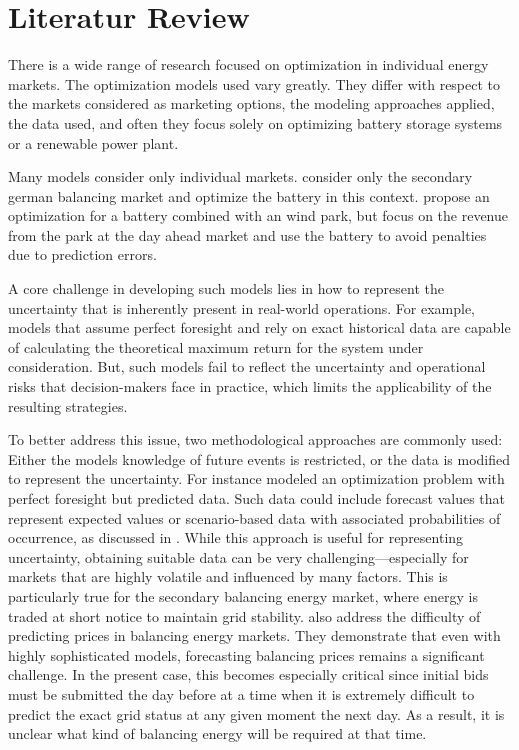 \chapter{Literatur Review}

There is a wide range of research focused on optimization in individual energy markets.
The optimization models used vary greatly.
They differ with respect to the markets considered as marketing options,
the modeling approaches applied, the data used, and often they focus solely on optimizing
battery storage systems or a renewable power plant.

Many models consider only individual markets. \cite{Olk.2019} consider only the secondary german balancing market and
optimize the battery in this context. \cite{Cai.2016} propose an optimization for a battery combined with an wind park, but
focus on the revenue from the park at the day ahead market and use the battery to avoid penalties due to prediction errors.

A core challenge in developing such models lies in how to represent the uncertainty
that is inherently present in real-world operations. For example, models that assume perfect
foresight and rely on exact historical data
are capable of calculating the theoretical maximum return for the system under consideration.
But, such models fail to reflect the uncertainty and operational risks
that decision-makers face in practice, which limits the applicability of the resulting strategies.

To better address this issue, two methodological approaches are commonly used:
Either the model\textquotesingle s knowledge of future events is restricted,
or the data is modified to represent the uncertainty.
For instance \cite{Nitsch.2021} modeled an optimization problem with perfect foresight but predicted data.
Such data could include forecast values that represent expected values or scenario-based data with associated
probabilities of occurrence, as discussed in \cite{Krishnamurthy.2018}.
While this approach is useful for representing uncertainty, obtaining suitable data can be very
challenging—especially for markets that are highly volatile and influenced by many factors.
This is particularly true for the secondary balancing energy market, where energy is traded at short notice to maintain grid stability.
\cite{OConnor.2024} also address the difficulty of predicting prices in balancing energy markets.
They demonstrate that even with highly sophisticated models, forecasting balancing prices remains a significant challenge.
In the present case, this becomes especially critical since initial bids must be submitted the day before at a time when it is
extremely difficult to predict the exact grid status at any given moment the next day.
As a result, it is unclear what kind of balancing energy will be required at that time.

